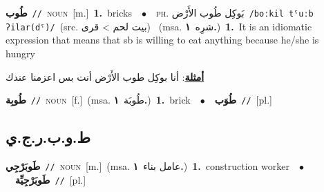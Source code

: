 \documentclass[10pt,a4paper,twoside]{article} %
\begin{document}
\begin{multicols}{2}
{\setlength\topsep{0pt}\textbf{\foreignlanguage{arabic}{طُوب}}\ {\color{gray}\texttt{//}\color{black}}\ \textsc{noun}\ [m.]\ \textbf{1.}~bricks\ \ $\bullet$\ \ \textsc{ph.} \color{gray} \foreignlanguage{arabic}{بَوكِل طُوب الأَرْض}\color{black}\ {\color{gray}\texttt{/{\sffamily boːkil tˤuːb ʔilar(dˤ)}/}\color{black}}\ \color{gray}(src. \foreignlanguage{arabic}{بيت لحم > قرى})\color{black}\ \color{gray} (msa. \foreignlanguage{arabic}{شرِه}~\foreignlanguage{arabic}{\textbf{١.}})\color{black}\ \textbf{1.}~It is an idiomatic expression that means that sb is willing to eat anything because he/she is hungry\  \begin{flushright}\color{gray}\foreignlanguage{arabic}{\textbf{\underline{\foreignlanguage{arabic}{أمثلة}}}: أنا بوكِل طوب الأَرْض أنت بس اعزمنا عندك}\end{flushright}\color{black}} \vspace{2mm}

{\setlength\topsep{0pt}\textbf{\foreignlanguage{arabic}{طُوبِة}}\ {\color{gray}\texttt{//}\color{black}}\ \textsc{noun}\ [f.]\ \color{gray}(msa. \foreignlanguage{arabic}{طُوبَة}~\foreignlanguage{arabic}{\textbf{١.}})\color{black}\ \textbf{1.}~brick\ \ $\bullet$\ \ \setlength\topsep{0pt}\textbf{\foreignlanguage{arabic}{طُوَب}}\ {\color{gray}\texttt{//}\color{black}}\ [pl.]\ } \vspace{2mm}

\vspace{-3mm}
\subsection*{\color{blue}\foreignlanguage{arabic}{ط.و.ب.ر.ج.ي}\color{blue}{ (ntws)}} 

{\setlength\topsep{0pt}\textbf{\foreignlanguage{arabic}{طَوبَرْجِي}}\ {\color{gray}\texttt{//}\color{black}}\ \textsc{noun}\ [m.]\ \color{gray}(msa. \foreignlanguage{arabic}{عامل بناء}~\foreignlanguage{arabic}{\textbf{١.}})\color{black}\ \textbf{1.}~construction worker\ \ $\bullet$\ \ \setlength\topsep{0pt}\textbf{\foreignlanguage{arabic}{طَوبَرْجِيِّة}}\ {\color{gray}\texttt{//}\color{black}}\ [pl.]\ } \vspace{2mm}


\end{multicols}
\end{document}
